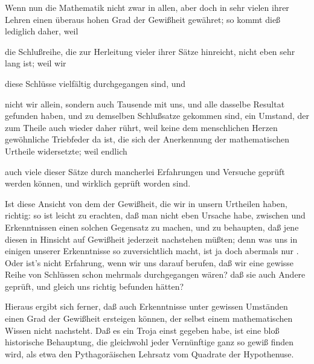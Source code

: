 \begin{aufza}
\begin{aufzb}
\end{aufzb}
\item  Wenn nun die Mathematik nicht zwar in allen, aber doch in sehr vielen ihrer Lehren einen überaus hohen Grad der Gewißheit gewähret; so kommt dieß lediglich daher, weil~
\begin{aufzb}
\item  die Schlußreihe, die zur Herleitung vieler ihrer Sätze hinreicht, nicht eben sehr lang ist; weil wir
\item  diese Schlüsse vielfältig durchgegangen sind, und
\item  nicht wir allein, sondern auch Tausende mit uns, und alle dasselbe Resultat gefunden haben, und zu demselben Schlußsatze gekommen sind,
ein Umstand, der zum Theile auch wieder daher rührt, weil keine dem menschlichen Herzen gewöhnliche Triebfeder da ist, die sich der Anerkennung der mathematischen Urtheile widersetzte; weil endlich
\item  auch viele dieser Sätze durch mancherlei Erfahrungen und Versuche geprüft werden können, und wirklich geprüft worden sind.
\end{aufzb}
\item  Ist diese Ansicht von dem  der Gewißheit, die wir in unsern Urtheilen haben, richtig: so ist leicht zu erachten, daß man nicht eben Ursache habe, zwischen  und  Erkenntnissen einen solchen Gegensatz zu machen, und zu behaupten, daß jene diesen in Hinsicht auf Gewißheit jederzeit nachstehen müßten; denn was uns in einigen unserer Erkenntnisse  so zuversichtlich macht, ist ja doch abermals nur . Oder ist's nicht Erfahrung, wenn wir uns darauf berufen, daß wir eine gewisse Reihe von Schlüssen schon mehrmals durchgegangen wären? daß sie auch Andere geprüft, und gleich uns richtig befunden hätten? \usw
\item  Hieraus ergibt sich ferner, daß auch  Erkenntnisse unter gewissen Umständen einen Grad der Gewißheit ersteigen können, der selbst einem mathematischen Wissen nicht nachsteht. Daß es ein Troja einst gegeben habe, ist eine bloß historische Behauptung, die gleichwohl jeder Vernünftige ganz so gewiß finden wird, als etwa den Pythagoräischen Lehrsatz vom Quadrate der Hypothenuse.

\end{aufza}
